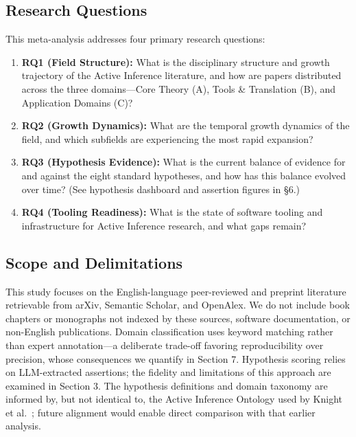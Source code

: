 \documentclass[
]{article}
\providecommand{\tightlist}{%
  \setlength{\itemsep}{0pt}\setlength{\parskip}{0pt}}
\begin{document}
\subsection{Research Questions}\label{research-questions}

This meta-analysis addresses four primary research questions:

\begin{enumerate}
\def\labelenumi{\arabic{enumi}.}
\tightlist
\item
  \textbf{RQ1 (Field Structure):} What is the disciplinary structure and
  growth trajectory of the Active Inference literature, and how are
  papers distributed across the three domains---Core Theory (A), Tools
  \& Translation (B), and Application Domains (C)?
\item
  \textbf{RQ2 (Growth Dynamics):} What are the temporal growth dynamics
  of the field, and which subfields are experiencing the most rapid
  expansion?
\item
  \textbf{RQ3 (Hypothesis Evidence):} What is the current balance of
  evidence for and against the eight standard hypotheses, and how has
  this balance evolved over time? (See hypothesis dashboard and
  assertion figures in §6.)
\item
  \textbf{RQ4 (Tooling Readiness):} What is the state of software
  tooling and infrastructure for Active Inference research, and what
  gaps remain?
\end{enumerate}

\subsection{Scope and Delimitations}\label{scope-and-delimitations}

This study focuses on the English-language peer-reviewed and preprint
literature retrievable from arXiv, Semantic Scholar, and OpenAlex. We do
not include book chapters or monographs not indexed by these sources,
software documentation, or non-English publications. Domain
classification uses keyword matching rather than expert annotation---a
deliberate trade-off favoring reproducibility over precision, whose
consequences we quantify in Section 7. Hypothesis scoring relies on
LLM-extracted assertions; the fidelity and limitations of this approach
are examined in Section 3. The hypothesis definitions and domain
taxonomy are informed by, but not identical to, the Active Inference
Ontology used by Knight et al.~\citep{knight2022fep}; future alignment
would enable direct comparison with that earlier analysis.
\end{document}
